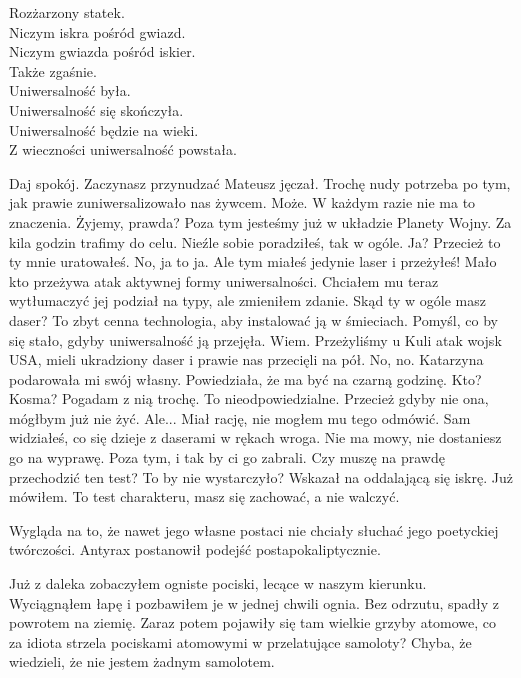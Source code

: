 Rozżarzony statek. \\
Niczym iskra pośród gwiazd. \\
Niczym gwiazda pośród iskier. \\
Także zgaśnie. \\

Uniwersalność była. \\
Uniwersalność się skończyła. \\
Uniwersalność będzie na wieki. \\
Z wieczności uniwersalność powstała. \\

\begin{dialogue}
\ds{} Daj spokój. Zaczynasz przynudzać \dm{} Mateusz jęczał. 
\ds{} Trochę nudy potrzeba po tym, jak prawie zuniwersalizowało nas żywcem.
\ds{} Może. W każdym razie nie ma to znaczenia. Żyjemy, prawda? Poza tym jesteśmy już w układzie Planety Wojny. Za kila godzin trafimy do celu.
\ds{} Nieźle sobie poradziłeś, tak w ogóle.
\ds{} Ja? Przecież to ty mnie uratowałeś. 
\ds{} No, ja to ja. Ale tym miałeś jedynie laser i przeżyłeś! Mało kto przeżywa atak aktywnej formy uniwersalności. \dm{} Chciałem mu teraz wytłumaczyć jej podział na typy, ale zmieniłem zdanie. \dm{}
Skąd ty w ogóle masz daser? To zbyt cenna technologia, aby instalować ją w śmieciach. Pomyśl, co by się stało, gdyby uniwersalność ją przejęła.
\ds{} Wiem. Przeżyliśmy u Kuli atak wojsk USA, mieli ukradziony daser i prawie nas przecięli na pół.
\ds{} No, no.
\ds{} Katarzyna podarowała mi swój własny. Powiedziała, że ma być na czarną godzinę.
\ds{} Kto? Kosma? Pogadam z nią trochę. To nieodpowiedzialne.
\ds{} Przecież gdyby nie ona, mógłbym już nie żyć.
\ds{} Ale... \dm{} Miał rację, nie mogłem mu tego odmówić. \dm{} Sam widziałeś, co się dzieje z daserami w rękach wroga. Nie ma mowy, nie dostaniesz go na wyprawę.
Poza tym, i tak by ci go zabrali.
\ds{} Czy muszę na prawdę przechodzić ten test? To by nie wystarczyło? \dm{} Wskazał na oddalającą się iskrę.
\ds{} Już mówiłem. To test charakteru, masz się zachować, a nie walczyć.
\end{dialogue}

\divider{}

Wygląda na to, że nawet jego własne postaci nie chciały słuchać jego poetyckiej twórczości.
Antyrax postanowił podejść postapokaliptycznie.

\divider{}

Już z daleka zobaczyłem ogniste pociski, lecące w naszym kierunku.
Wyciągnąłem łapę i pozbawiłem je w jednej chwili ognia.
Bez odrzutu, spadły z powrotem na ziemię.
Zaraz potem pojawiły się tam wielkie grzyby atomowe, co za idiota strzela pociskami atomowymi w przelatujące samoloty?
Chyba, że wiedzieli, że nie jestem żadnym samolotem.

